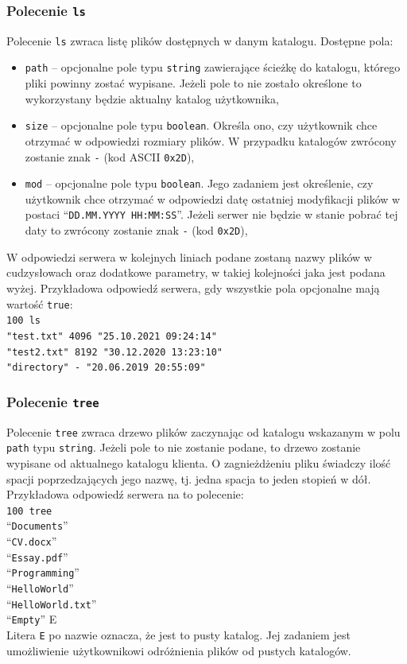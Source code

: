 \documentclass[8pt,a4paper]{article}
\newcommand{\quotes}[1]{``#1''}
\newcommand{\quotcode}[1]{\quotes{\texttt{#1}}}
\begin{document}
\subsubsection{Polecenie \texttt{ls}}
Polecenie \texttt{ls} zwraca listę plików dostępnych w danym katalogu. Dostępne pola:
\begin{itemize}
    \item \texttt{path} -- opcjonalne pole typu \texttt{string} zawierające ścieżkę do katalogu, którego pliki powinny zostać wypisane. Jeżeli pole to nie zostało określone to wykorzystany będzie aktualny katalog użytkownika,
    \item \texttt{size} -- opcjonalne pole typu \texttt{boolean}. Określa ono, czy użytkownik chce otrzymać w odpowiedzi rozmiary plików. W przypadku katalogów zwrócony zostanie znak \texttt{-} (kod ASCII \texttt{0x2D}),
    \item \texttt{mod} -- opcjonalne pole typu \texttt{boolean}. Jego zadaniem jest określenie, czy użytkownik chce otrzymać w odpowiedzi datę ostatniej modyfikacji plików w postaci \quotcode{DD.MM.YYYY HH:MM:SS}. Jeżeli serwer nie będzie w stanie pobrać tej daty to zwrócony zostanie znak \texttt{-} (kod \texttt{0x2D}),
\end{itemize}
W odpowiedzi serwera w kolejnych liniach podane zostaną nazwy plików w cudzysłowach oraz dodatkowe parametry, w takiej kolejności jaka jest podana wyżej. Przykładowa odpowiedź serwera, gdy wszystkie pola opcjonalne mają wartość \texttt{true}:\\
\texttt{100 ls}\\
\texttt{"test.txt"\ 4096 "25.10.2021 09:24:14"} \\
\texttt{"test2.txt"\ 8192 "30.12.2020 13:23:10"} \\
\texttt{"directory"\ - "20.06.2019 20:55:09"}

\subsubsection{Polecenie \texttt{tree}}
Polecenie \texttt{tree} zwraca drzewo plików zaczynając od katalogu wskazanym w polu \texttt{path} typu \texttt{string}. Jeżeli pole to nie zostanie podane, to drzewo zostanie wypisane od aktualnego katalogu klienta. O zagnieżdżeniu pliku świadczy ilość spacji poprzedzających jego nazwę, tj. jedna spacja to jeden stopień w dół. Przykładowa odpowiedź serwera na to polecenie:\\
\texttt{100 tree}\\
\quotcode{Documents}\\
\hphantom{spaces}\quotcode{CV.docx}\\
\hphantom{spaces}\quotcode{Essay.pdf}\\
\quotcode{Programming}\\
\hphantom{spaces}\quotcode{HelloWorld}\\
\hphantom{spaces}\hphantom{spaces}\quotcode{HelloWorld.txt}\\
\hphantom{spaces}\quotcode{Empty} E\\
Litera \texttt{E} po nazwie oznacza, że jest to pusty katalog. Jej zadaniem jest umożliwienie użytkownikowi odróżnienia plików od pustych katalogów.
\end{document}
